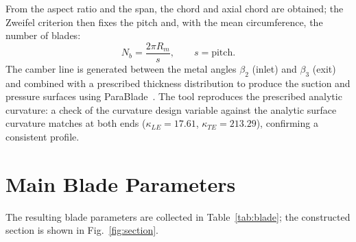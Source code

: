 From the aspect ratio and the span, the chord and axial chord are obtained; the
Zweifel criterion then fixes the pitch and, with the mean circumference, the
number of blades:
\begin{equation}
    N_b = \frac{2\pi R_m}{s},\qquad s = \text{pitch}.
\end{equation}
The camber line is generated between the metal angles $\beta_2$ (inlet) and
$\beta_3$ (exit) and combined with a prescribed thickness distribution to produce
the suction and pressure surfaces using ParaBlade~\cite{parablade}. The tool
reproduces the prescribed analytic curvature: a check of the curvature design
variable against the analytic surface curvature matches at both ends
($\kappa_{LE}=17.61$, $\kappa_{TE}=213.29$), confirming a consistent profile.

\section{Main Blade Parameters}

The resulting blade parameters are collected in Table~\ref{tab:blade}; the
constructed section is shown in Fig.~\ref{fig:section}.





